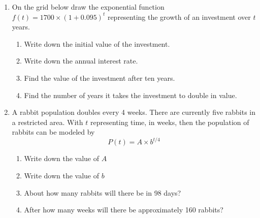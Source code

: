 \documentclass[12pt, twoside]{article}
\begin{document}
\begin{enumerate}
\item On the grid below draw the exponential function $\displaystyle f(t)=1700 \times \left( 1+0.095 \right)^t$ representing the growth of an investment over $t$ years.
\begin{multicols}{2}
    \begin{enumerate}[itemsep=1.2cm]
        \item Write down the initial value of the investment.
        \item Write down the annual interest rate.
        \item Find the value of the investment after ten years.\vspace{1cm}
        \item Find the number of years it takes the investment to double in value.
    \end{enumerate}
    \begin{center}
    \end{center}
    \end{multicols}

\item A rabbit population doubles every 4 weeks. There are currently five rabbits in a restricted area. With $t$ representing time, in weeks, then the population of rabbits can be modeled by \[\displaystyle P(t)=A \times b^{t/4}\]
    \begin{enumerate}[itemsep=0.75cm]
        \item Write down the value of $A$
        \item Write down the value of $b$
        \item About how many rabbits will there be in 98 days? \vspace{2cm}
        \item After how many weeks will there be approximately 160 rabbits?
    \end{enumerate}


\end{enumerate}
\end{document}
